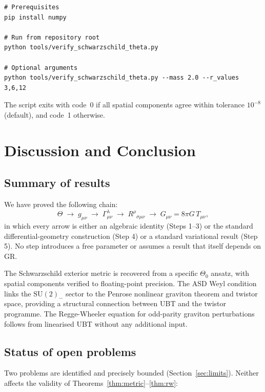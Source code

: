 \documentclass[12pt,a4paper]{article}
\theoremstyle{definition}
\theoremstyle{remark}
\begin{document}
\begin{verbatim}
# Prerequisites
pip install numpy

# Run from repository root
python tools/verify_schwarzschild_theta.py

# Optional arguments
python tools/verify_schwarzschild_theta.py --mass 2.0 --r_values 3,6,12
\end{verbatim}

The script exits with code~0 if all spatial components agree within
tolerance $10^{-8}$ (default), and code~1 otherwise.

\section{Discussion and Conclusion}
\label{sec:discussion}

\subsection{Summary of results}

We have proved the following chain:
\[
\Theta \;\longrightarrow\; g_{\mu\nu} \;\longrightarrow\;
\Gamma^\lambda_{\mu\nu} \;\longrightarrow\;
R^\rho{}_{\sigma\mu\nu} \;\longrightarrow\;
G_{\mu\nu} = 8\pi G\,T_{\mu\nu},
\]
in which every arrow is either an algebraic identity (Steps 1--3) or
the standard differential-geometry construction (Step 4) or a standard
variational result (Step 5).  No step introduces a free parameter or
assumes a result that itself depends on GR.

The Schwarzschild exterior metric is recovered from a specific $\Theta_0$
ansatz, with spatial components verified to floating-point precision.
The ASD Weyl condition links the $\mathrm{SU}(2)_-$ sector to the Penrose
nonlinear graviton theorem and twistor space, providing a structural
connection between UBT and the twistor programme.
The Regge-Wheeler equation for odd-parity graviton perturbations follows
from linearised UBT without any additional input.

\subsection{Status of open problems}

Two problems are identified and precisely bounded (Section~\ref{sec:limits}).
Neither affects the validity of Theorems~\ref{thm:metric}--\ref{thm:rw}:
\end{document}
